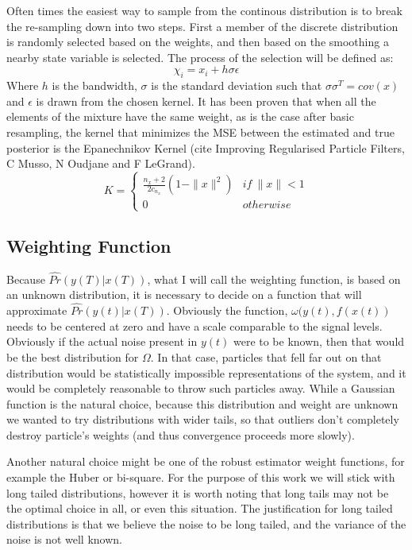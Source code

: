 Often times the easiest way to sample from the continous distribution is to break the 
re-sampling down into two steps. First a member of the discrete distribution is randomly
selected based on the weights, and then based on the smoothing a nearby state variable 
is selected. The process of the selection will be defined as:
\begin{equation}
\chi_i = x_i + h\sigma \epsilon
\end{equation}
Where $h$ is the bandwidth, $\sigma$ is the standard deviation such that $\sigma \sigma^T = cov(x)$
and $\epsilon$ is drawn from the chosen kernel.
It has been proven that when all the elements of the mixture
have the same weight, as is the case after basic resampling, the kernel that minimizes the 
MSE between the estimated and true posterior is the Epanechnikov Kernel (cite Improving Regularised
Particle Filters, C Musso, N Oudjane and F LeGrand). 
\begin{equation}
K = \left\{
\begin{array}{lr}
\frac{n_x+2}{2c_{n_x}}(1-\|x\|^2) & if\ \|x\| < 1\\
0 & otherwise
\end{array}\right.
\end{equation}

\subsection{Weighting Function}
Because $\hat{Pr}(y(T) | x(T))$, what I will call the weighting function,
is based on an unknown distribution, it is necessary to decide on a function
that will approximate $\hat{Pr}(y(t) | x(T))$. Obviously the function, $\omega(y(t), f(x(t))$
needs to be centered at zero and have a scale comparable to the signal levels.
Obviously if the actual noise present in $y(t)$ were to be known, then that would
be the best distribution for $\Omega$. In that case, particles that fell
far out on that distribution would be statistically impossible representations
of the system, and it would be completely reasonable to throw such particles away.
While a Gaussian function is the natural choice, because this distribution
and weight are unknown we wanted to try distributions
with wider tails, so that outliers don't completely destroy particle's weights
(and thus convergence proceeds more slowly).

Another natural choice might be one of the robust estimator weight functions, for
example the Huber or bi-square. For the purpose of this work we will stick
with long tailed distributions, however it is worth noting that long tails
may not be the optimal choice in all, or even this situation. The justification
for long tailed distributions is that we believe the noise to be long tailed,
and the variance of the noise is not well known.

